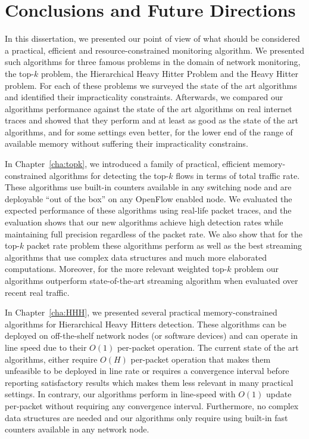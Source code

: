 \chapter{Conclusions and Future Directions}
\label{chap:conclusion}

In this dissertation, we presented our point of view of what should be considered a practical, efficient and resource-constrained monitoring algorithm. We presented such algorithms for three famous problems in the domain of network monitoring, the top-$k$ problem, the Hierarchical Heavy Hitter Problem and the Heavy Hitter problem. For each of these problems we surveyed the state of the art algorithms and identified their impracticality constraints. Afterwards, we compared our algorithms performance against the state of the art algorithms on real internet traces and showed that they perform and at least as good as the state of the art algorithms, and for some settings even better, for the lower end of the range of available memory without suffering their impracticality constrains. 

In Chapter~\ref{cha:topk}, we introduced a family of practical, efficient memory-constrained algorithms for detecting the top-$k$ flows in terms of total traffic rate. These algorithms use built-in counters available in any switching node and are deployable “out of the box” on any OpenFlow enabled node. We evaluated the expected performance of these algorithms using real-life packet traces, and the evaluation shows that our new algorithms achieve high detection rates while maintaining full precision regardless of the packet rate. We also show that for the top-$k$ packet rate problem these algorithms perform as well as the best streaming algorithms that use complex data structures and much more elaborated computations. Moreover, for the more relevant weighted top-$k$ problem our algorithms outperform state-of-the-art streaming algorithm when evaluated over recent real traffic. 

In Chapter~\ref{cha:HHH}, we presented several practical memory-constrained algorithms for Hierarchical Heavy Hitters detection. These algorithms can be deployed on off-the-shelf network nodes (or software devices) and can operate in line speed due to their $O(1)$ per-packet operation. The current state of the art algorithms, either require $O(H)$ per-packet operation that makes them unfeasible to be deployed in line rate or requires a convergence interval before reporting satisfactory results which makes them less relevant in many practical settings. In contrary, our algorithms perform in line-speed with $O(1)$ update per-packet without requiring any convergence interval. Furthermore, no complex data structures are needed and our algorithms only require using built-in fast counters available in any network node.

